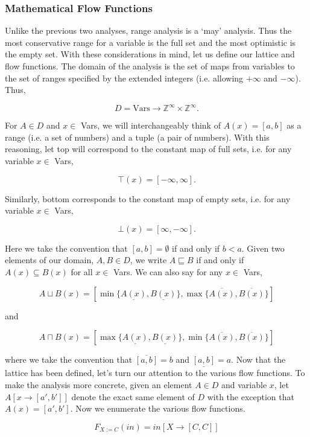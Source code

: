 \documentclass{article}
\newcommand{\Z}{\mathbb{Z}}
\theoremstyle{definition}
\begin{document}
\subsubsection{Mathematical Flow Functions}

Unlike the previous two analyses, range analysis is a `may' analysis. Thus the most conservative range for a variable is the full set and the most optimistic is the empty set. With these considerations in mind, let us define our lattice and flow functions. The domain of the analysis is the set of maps from variables to the set of ranges specified by the extended integers (i.e. allowing $+\infty$ and $-\infty$). Thus,

\[ D = \text{Vars} \rightarrow \Z^{\infty} \times \Z^{\infty}. \]

For $A \in D$ and $x \in $ Vars, we will interchangeably think of $A(x) = [a, b]$ as a range (i.e. a set of numbers) and a tuple (a pair of numbers). With this reasoning, let top will correspond to the constant map of full sets, i.e. for any variable $x \in $ Vars,

\[  \top(x) =  [-\infty, \infty]. \]

Similarly, bottom corresponds to the constant map of empty sets, i.e. for any variable $x \in $ Vars,

\[  \bot(x) =  [\infty, -\infty]. \]

Here we take the convention that $[a, b] = \emptyset$ if and only if $b < a$. Given two elements of our domain, $A, B \in D$, we write $A \sqsubseteq B$ if and only if $A(x) \subseteq B(x)$ for all $x \in$ Vars. We can also say for any $x \in $ Vars,

\[ A \sqcup B(x) = [\min \{ \underline{A(x)}, \underline{B(x)} \} , \max \{  \overline{A(x)}, \overline{B(x)} \} ]\]

\noindent and

\[ A \sqcap B(x) = [\max \{  \underline{A(x)} , \underline{B(x)} \} , \min \{ \overline{A(x)} , \overline{B(x)} \} ]\]

\noindent where we take the convention that $\overline{[a, b]} = b$ and $\underline{[a, b]} = a$. Now that the lattice has been defined, let's turn our attention to the various flow functions. To make the analysis more concrete, given an element $A \in D$ and variable $x$, let $A[x \rightarrow [a', b']]$ denote the exact same element of $D$ with the exception that $A(x) = [a', b']$. Now we enumerate the various flow functions.

\[ F_{X:= C}(in) = in[X \rightarrow [C, C]] \]
\end{document}
